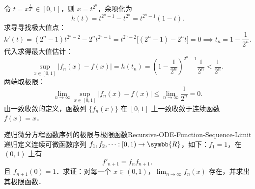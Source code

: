 \begin{myproof}
    令 $t = x^{\frac{1}{2^n}} \in [0, 1]$，则 $x = t^{2^n}$，余项化为
    \begin{equation}
        h(t) = t^{2^n - 1} - t^{2^n} = t^{2^n - 1}(1 - t).
    \end{equation}
    求导寻找极大值点：
    \begin{equation}
        h'(t) = (2^n - 1)t^{2^n - 2} - 2^n t^{2^n - 1} = t^{2^n - 2} \bigl[ (2^n - 1) - 2^n t \bigr] = 0 \implies t_n = 1 - \frac{1}{2^n}.
    \end{equation}
    代入求得最大值估计：
    \begin{equation}
        \sup_{x \in [0, 1]} |f_n(x) - f(x)| = h(t_n) = \left( 1 - \frac{1}{2^n} \right)^{2^n - 1} \frac{1}{2^n} < \frac{1}{2^n}.
    \end{equation}
    两端取极限：
    \begin{equation}
        \lim_{n\to\infty} \sup_{x \in [0, 1]} |f_n(x) - f(x)| \leqslant \lim_{n\to\infty} \frac{1}{2^n} = 0.
    \end{equation}
    由一致收敛的定义，函数列 $\{f_n(x)\}$ 在 $[0, 1]$ 上一致收敛于连续函数 $f(x) = x$．
\end{myproof}

\begin{problem}{递归微分方程函数序列的极限与极限函数}{Recursive-ODE-Function-Sequence-Limit}
    递归定义连续可微函数序列 $f_1, f_2, \dots: [0, 1) \to \symbb{R}$，如下：$f_1 = 1$，在 $(0, 1)$ 上有
    \begin{equation}
        f'_{n+1} = f_n f_{n+1},
    \end{equation}
    且 $f_{n+1}(0) = 1$．求证：对每一个 $x \in (0, 1)$，$\lim_{n\to\infty} f_n(x)$ 存在，并求出其极限函数．
\end{problem}

